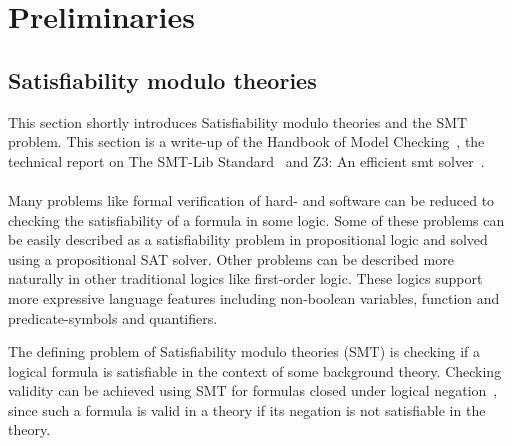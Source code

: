 \chapter{Preliminaries}
\label{chp:pre}
\section{Satisfiability modulo theories}
\label{sec:smt}
This section shortly introduces Satisfiability modulo theories and the SMT problem.
This section is a write-up of the Handbook of Model Checking~\cite{smt},
the technical report on The SMT-Lib Standard~\cite{smtlib}
and Z3: An efficient smt solver~\cite{z3}.
\\ \\
Many problems like formal verification of hard- and software can be reduced
to checking the satisfiability of a formula in some logic.
Some of these problems can be easily described as a satisfiability problem
in propositional logic and solved using a propositional SAT solver.
Other problems can be described more naturally in other traditional logics like first-order logic.
These logics support more expressive language features including
non-boolean variables, function and predicate-symbols and quantifiers.

The defining problem of Satisfiability modulo theories (SMT)
is checking if a logical formula is satisfiable in the context of some background theory.
Checking validity can be achieved using SMT for formulas closed under logical negation~\cite{smtlib},
since such a formula is valid in a theory if its negation is not satisfiable in the theory.

